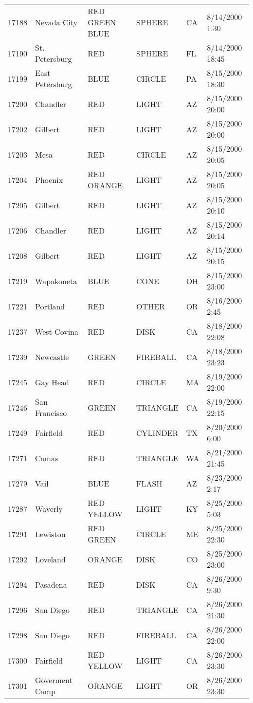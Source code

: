 \begin{tabular}{llllll}
17188 & Nevada City & RED GREEN BLUE & SPHERE & CA & 8/14/2000 1:30 \\
17190 & St. Petersburg & RED & SPHERE & FL & 8/14/2000 18:45 \\
17199 & East Petersburg & BLUE & CIRCLE & PA & 8/15/2000 18:30 \\
17200 & Chandler & RED & LIGHT & AZ & 8/15/2000 20:00 \\
17202 & Gilbert & RED & LIGHT & AZ & 8/15/2000 20:00 \\
17203 & Mesa & RED & CIRCLE & AZ & 8/15/2000 20:05 \\
17204 & Phoenix & RED ORANGE & LIGHT & AZ & 8/15/2000 20:05 \\
17205 & Gilbert & RED & LIGHT & AZ & 8/15/2000 20:10 \\
17206 & Chandler & RED & LIGHT & AZ & 8/15/2000 20:14 \\
17208 & Gilbert & RED & LIGHT & AZ & 8/15/2000 20:15 \\
17219 & Wapakoneta & BLUE & CONE & OH & 8/15/2000 23:00 \\
17221 & Portland & RED & OTHER & OR & 8/16/2000 2:45 \\
17237 & West Covina & RED & DISK & CA & 8/18/2000 22:08 \\
17239 & Newcastle & GREEN & FIREBALL & CA & 8/18/2000 23:23 \\
17245 & Gay Head & RED & CIRCLE & MA & 8/19/2000 22:00 \\
17246 & San Francisco & GREEN & TRIANGLE & CA & 8/19/2000 22:15 \\
17249 & Fairfield & RED & CYLINDER & TX & 8/20/2000 6:00 \\
17271 & Camas & RED & TRIANGLE & WA & 8/21/2000 21:45 \\
17279 & Vail & BLUE & FLASH & AZ & 8/23/2000 2:17 \\
17287 & Waverly & RED YELLOW & LIGHT & KY & 8/25/2000 5:03 \\
17291 & Lewiston & RED GREEN & CIRCLE & ME & 8/25/2000 22:30 \\
17292 & Loveland & ORANGE & DISK & CO & 8/25/2000 23:00 \\
17294 & Pasadena & RED & DISK & CA & 8/26/2000 9:30 \\
17296 & San Diego & RED & TRIANGLE & CA & 8/26/2000 21:30 \\
17298 & San Diego & RED & FIREBALL & CA & 8/26/2000 22:00 \\
17300 & Fairfield & RED YELLOW & LIGHT & CA & 8/26/2000 23:30 \\
17301 & Goverment Camp & ORANGE & LIGHT & OR & 8/26/2000 23:30 \\

\end{tabular}
